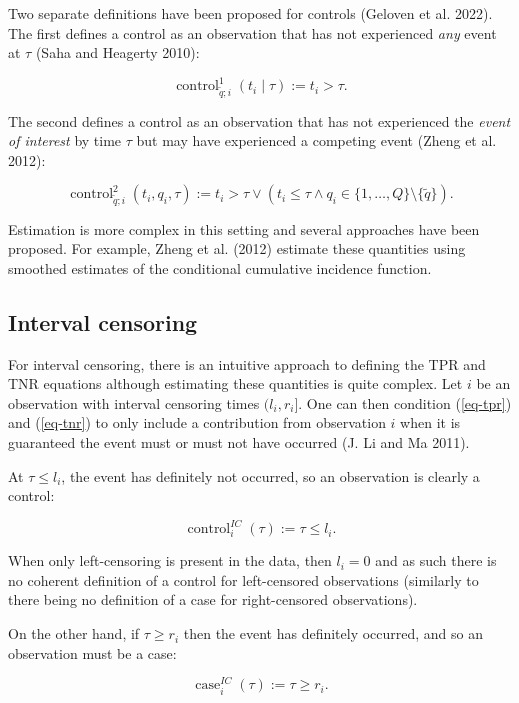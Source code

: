\documentclass[
  letterpaper,
  krantz2]{style/krantz}
\begin{document}
Two separate definitions have been proposed for controls (Geloven et al.
2022). The first defines a control as an observation that has not
experienced \emph{any} event at \(\tau\) (Saha and Heagerty 2010):

\[
\operatorname{control}_{\tilde{q};i}^{1}(t_i  \mid  \tau) := t_i > \tau.
\]

The second defines a control as an observation that has not experienced
the \emph{event of interest} by time \(\tau\) but may have experienced a
competing event (Zheng et al. 2012):

\[
\operatorname{control}^2_{\tilde{q};i}(t_i, q_i, \tau) := t_i > \tau \vee (t_i \le \tau \wedge q_i \in \{1,\ldots,Q\} \setminus \{\tilde{q}\}).
\]

Estimation is more complex in this setting and several approaches have
been proposed. For example, Zheng et al. (2012) estimate these
quantities using smoothed estimates of the conditional cumulative
incidence function.

\subsection{Interval censoring}\label{interval-censoring-2}

For interval censoring, there is an intuitive approach to defining the
TPR and TNR
equations
although estimating these quantities is quite complex. Let \(i\) be an
observation with interval censoring times \((l_i, r_i]\). One can then
condition (\ref{eq-tpr}) and (\ref{eq-tnr}) to only include a
contribution from observation \(i\) when it is guaranteed the event must
or must not have occurred (J. Li and Ma 2011).

At \(\tau \le l_i\), the event has definitely not occurred, so an
observation is clearly a control:

\[
\operatorname{control}^{IC}_i(\tau) := \tau \le l_i.
\]

When only left-censoring is present in the data, then \(l_i = 0\) and as
such there is no coherent definition of a control for left-censored
observations (similarly to there being no definition of a case for
right-censored observations).

On the other hand, if \(\tau \ge r_i\) then the event has definitely
occurred, and so an observation must be a case:

\[
\operatorname{case}^{IC}_i(\tau) := \tau \ge r_i.
\]
\end{document}
